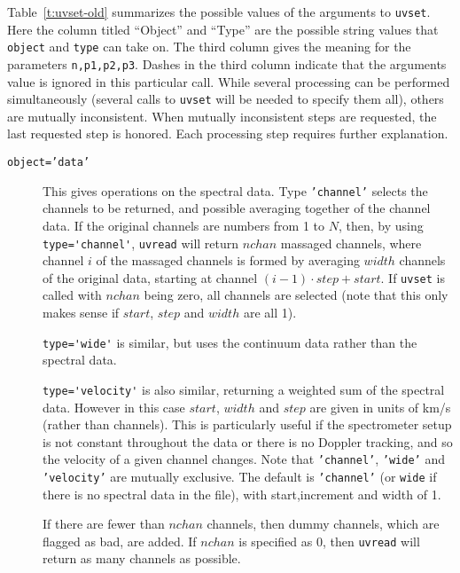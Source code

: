 \documentclass{report}
\begin{document}
Table~\ref{t:uvset-old} summarizes the possible values of the arguments to {\tt uvset}.
Here the column titled ``Object'' and ``Type'' are the possible string
values that {\tt object} and {\tt type} can take on. The third column
gives the meaning for the parameters \verb+n,p1,p2,p3+.
Dashes in the third column indicate that the arguments value is ignored in
this particular call. While several processing can be performed
simultaneously (several calls to {\tt uvset} will be needed to specify them
all), others are mutually inconsistent. When mutually inconsistent
steps are requested, the last requested step is honored. Each processing
step requires further explanation.
\begin{description}
\item[\texttt{object='data'}] This gives operations on the spectral
data. Type {\tt 'channel'} selects the channels to be returned, and possible
averaging together of the channel data. If the original channels are
numbers from 1 to $N$, then, by using \verb+type='channel'+, {\tt uvread} will
return $nchan$ massaged channels, where channel $i$ of the massaged channels
is formed by averaging $width$ channels of the original data, starting at
channel $(i-1)\cdot step + start$. If {\tt uvset} is
called with $nchan$ being zero, all channels are selected (note that this
only makes sense if $start$, $step$ and $width$ are all 1).

\verb+type='wide'+ is similar, but
uses the continuum data rather than the spectral data.

\verb+type='velocity'+ is also
similar, returning a weighted sum of the spectral data. However in this
case $start$, $width$ and $step$ are given in units of
km/s (rather than channels). This is particularly useful if the
spectrometer setup is not constant throughout the data or there is no
Doppler tracking, and so the velocity of a given channel changes.
Note that {\tt 'channel'}, {\tt 'wide'} and {\tt 'velocity'} are
mutually exclusive. The default is {\tt 'channel'} (or {\tt wide} if there is
no spectral data in the file), with start,increment
and width of 1.

If there are fewer than $nchan$ channels, then dummy channels, which are
flagged as bad, are added. If $nchan$ is specified as 0, then {\tt uvread}
will return as many channels as possible.


\end{description}
\end{document}
